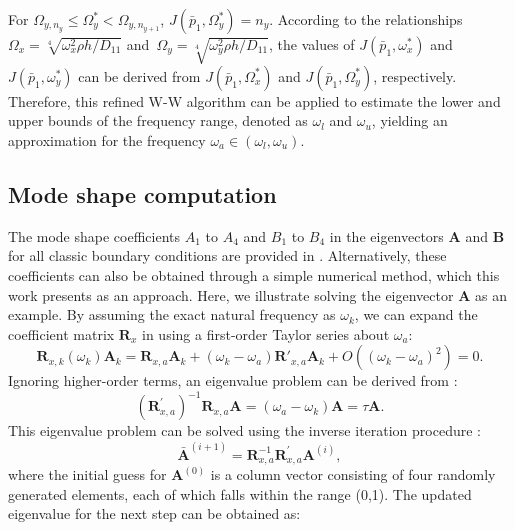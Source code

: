 \documentclass[preprint,12pt]{elsarticle}
\begin{document}
%
For \(\Omega_{y,n_y} \leq \Omega_y^* < \Omega_{y,n_{y+1}}\), \(J(\bar{p}_1, \Omega_y^*) = n_y\).
According to the relationships 
$\Omega_x = \sqrt[4]{{\omega_x^2 \rho h}/{D_{11}}}$ and\ $\Omega_y = \sqrt[4]{{\omega_y^2 \rho h}/{D_{11}}}$, 
the values of \(J(\bar{p}_1, \omega_x^*)\) and \(J(\bar{p}_1, \omega_y^*)\) can be derived from \(J(\bar{p}_1, \Omega_x^*)\) and \(J(\bar{p}_1, \Omega_y^*)\), respectively. Therefore, this refined W-W algorithm can be applied to estimate the lower and upper bounds of the frequency range, denoted as \(\omega_l\) and \(\omega_u\), yielding an approximation for the frequency \(\omega_a \in (\omega_l, \omega_u)\).
\subsection{Mode shape computation}
The mode shape coefficients \( A_1 \) to \( A_4 \) and \( B_1 \) to \( B_4 \) in the eigenvectors \( \mathbf{A} \) and \( \mathbf{B} \) for all classic boundary conditions are provided in \cite{xing2020extended}. 
Alternatively, these coefficients can also be obtained through a simple numerical method, which this work presents as an approach.
Here, we illustrate solving the eigenvector \( \mathbf{A} \) as an example.
By assuming the exact natural frequency as \( \omega_k \), we can expand the coefficient matrix \( \mathbf{R}_{x} \) in  using a first-order Taylor series about \( \omega_a \):
%
\begin{equation}\label{eq:Taylor}
	\mathbf{R}_{x,k}(\omega_k)\mathbf{A}_k = \mathbf{R}_{x,a}\mathbf{A}_k + (\omega_k - \omega_a)\mathbf{R}'_{x,a}\mathbf{A}_k + O\left((\omega_k - \omega_a)^2\right) = 0.
\end{equation}
%
Ignoring higher-order terms, an eigenvalue problem can be derived from :
%
\begin{equation}\label{eq:Newgeigen}
	(\mathbf{R}^{'}_{x,a})^{-1} \mathbf{R}_{x,a} \mathbf{A} = (\omega_a - \omega_k)\mathbf{A} = \tau \mathbf{A}.
\end{equation}
%
This eigenvalue problem can be solved using the inverse iteration procedure \cite{yuan2004second}:
%
\begin{equation}\label{eq:Inversepower}
	\bar{\mathbf{A}}^{(i+1)} = \mathbf{R}_{x,a}^{-1} \mathbf{R}^{'}_{x,a} \mathbf{A}^{(i)},	
\end{equation}
%
where the initial guess for \( \mathbf{A}^{(0)} \) is a column vector consisting of four randomly generated elements, each of which falls within the range (0,1). The updated eigenvalue for the next step can be obtained as:
\end{document}
